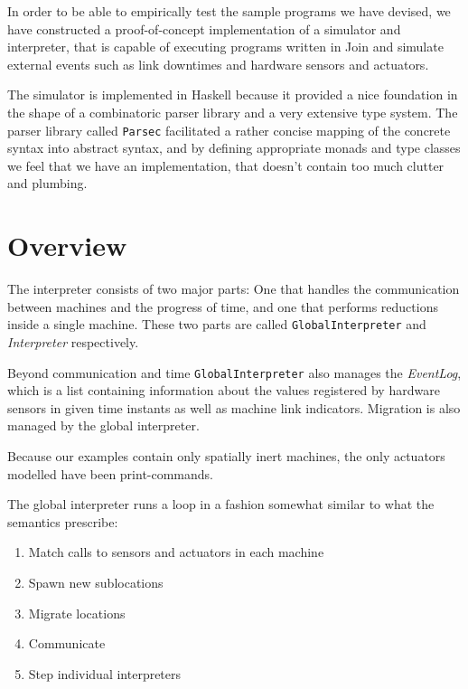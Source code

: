 

In order to be able to empirically test the sample programs we have devised, we
have constructed a proof-of-concept implementation of a simulator and
interpreter, that is capable of executing programs written in Join and simulate
external events such as link downtimes and hardware sensors and actuators.

The simulator is implemented in Haskell because it provided a nice foundation in
the shape of a combinatoric parser library and a very extensive type system. The
parser library called \texttt{Parsec} \cite{parsec} facilitated a rather
concise mapping of the concrete syntax into abstract syntax, and by defining
appropriate monads and type classes we feel that we have an implementation,
that doesn't contain too much clutter and plumbing.

\section{Overview}
The interpreter consists of two major parts: One that handles the communication
between machines and the progress of time, and one that performs reductions
inside a single machine. These two parts are called \texttt{GlobalInterpreter}
and \emph{Interpreter} respectively.

Beyond communication and time \texttt{GlobalInterpreter} also manages the
\emph{EventLog}, which is a list containing information about the values
registered by hardware sensors in given time instants as well as machine link
indicators. Migration is also managed by the global interpreter.

Because our examples contain only spatially inert machines, the only actuators
modelled have been print-commands.

The global interpreter runs a loop in a fashion somewhat similar to what the
semantics prescribe:

\begin{enumerate}
\item Match calls to sensors and actuators in each machine
\item Spawn new sublocations
\item Migrate locations
\item Communicate
\item Step individual interpreters
\end{enumerate}

